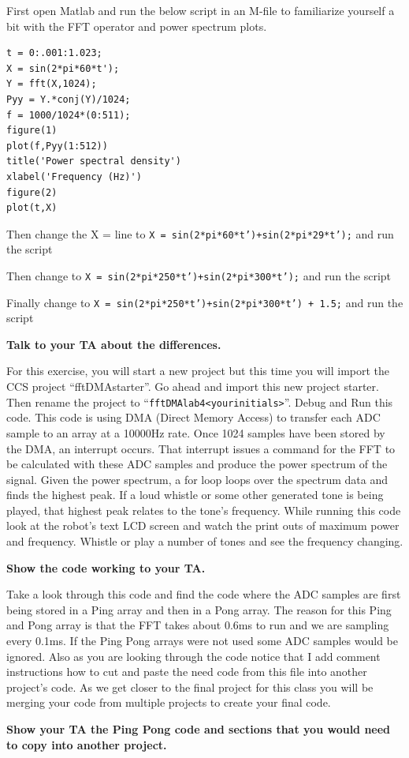 \documentclass[11pt]{article}
\begin{document}
First open Matlab and run the below script in an M-file to familiarize yourself a bit with the FFT operator and power spectrum plots.
%
\begin{verbatim}
t = 0:.001:1.023;
X = sin(2*pi*60*t');
Y = fft(X,1024);
Pyy = Y.*conj(Y)/1024;
f = 1000/1024*(0:511);
figure(1)
plot(f,Pyy(1:512))
title('Power spectral density')
xlabel('Frequency (Hz)')
figure(2)
plot(t,X)
\end{verbatim}
%
Then change the X = line to \texttt{X = sin(2*pi*60*t')+sin(2*pi*29*t');} and run the script

Then change to \texttt{X = sin(2*pi*250*t')+sin(2*pi*300*t');} and run the script

Finally change to \texttt{X = sin(2*pi*250*t')+sin(2*pi*300*t') + 1.5;} and run the script
%
\begin{checkoff}
        \textbf{Talk to your TA about the differences.}
\end{checkoff}
%
For this exercise, you will start a new project but this time you will import the CCS project “fftDMAstarter”. Go ahead and import this new project starter. Then rename the project to “\lstinline|fftDMAlab4<yourinitials>|”. Debug and Run this code. This code is using DMA (Direct Memory Access) to transfer each ADC sample to an array at a 10000Hz rate. Once 1024 samples have been stored by the DMA, an interrupt occurs. That interrupt issues a command for the FFT to be calculated with these ADC samples and produce the power spectrum of the signal. Given the power spectrum, a for loop loops over the spectrum data and finds the highest peak. If a loud whistle or some other generated tone is being played, that highest peak relates to the tone’s frequency. While running this code look at the robot’s text LCD screen and watch the print outs of maximum power and frequency. Whistle or play a number of tones and see the frequency changing.
%
\begin{checkoff}
        \textbf{Show the code working to your TA.}
\end{checkoff}
%
Take a look through this code and find the code where the ADC samples are first being stored in a Ping array and then in a Pong array. The reason for this Ping and Pong array is that the FFT takes about 0.6ms to run and we are sampling every 0.1ms. If the Ping Pong arrays were not used some ADC samples would be ignored. Also as you are looking through the code notice that I add comment instructions how to cut and paste the need code from this file into another project’s code. As we get closer to the final project for this class you will be merging your code from multiple projects to create your final code.
%
\begin{checkoff}
        \textbf{Show your TA the Ping Pong code and sections that you would need to copy into another project.}
\end{checkoff}
%
\end{document}
